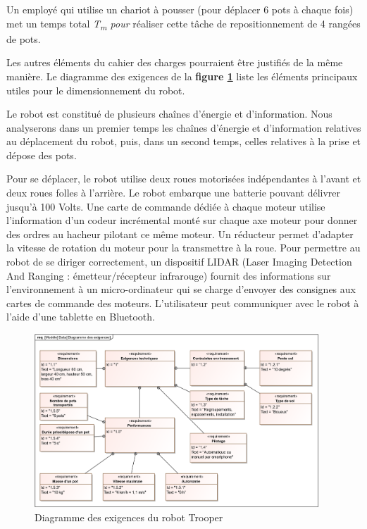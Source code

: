 Un employé qui utilise un chariot à pousser (pour déplacer 6 pots à
chaque fois) met un temps total \emph{T\textsubscript{m} pour} réaliser
cette tâche de repositionnement de 4 rangées de pots.



Les autres éléments du cahier des charges pourraient être justifiés de
la même manière. Le diagramme des exigences de la \textbf{figure \ref{fig4}}
liste les éléments principaux utiles pour le dimensionnement du robot.

Le robot est constitué de plusieurs chaînes d'énergie et d'information.
Nous analyserons dans un premier temps les chaînes d'énergie et
d'information relatives au déplacement du robot, puis, dans un second
temps, celles relatives à la prise et dépose des pots.

Pour se déplacer, le robot utilise deux roues motorisées indépendantes à
l'avant et deux roues folles à l'arrière. Le robot embarque une batterie
pouvant délivrer jusqu'à 100 Volts. Une carte de commande dédiée à
chaque moteur utilise l'information d'un codeur incrémental monté sur
chaque axe moteur pour donner des ordres au hacheur pilotant ce même
moteur. Un réducteur permet d'adapter la vitesse de rotation du moteur
pour la transmettre à la roue. Pour permettre au robot de se diriger
correctement, un dispositif LIDAR (Laser Imaging Detection And Ranging :
émetteur/récepteur infrarouge) fournit des informations sur
l'environnement à un micro-ordinateur qui se charge d'envoyer des
consignes aux cartes de commande des moteurs. L'utilisateur peut
communiquer avec le robot à l'aide d'une tablette en Bluetooth.

 



\begin{figure}[!htb]
\begin{center}
\includegraphics[width=0.95\textwidth]{images/image3.png}
\caption{Diagramme des exigences du robot Trooper  \label{fig4}}
\end{center}
\end{figure}


